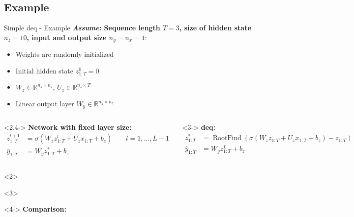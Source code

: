 \documentclass[8pt, t,
aspectratio=169,%
]{beamer}
\begin{document}
\subsection{Example}
\begin{frame}{Simple \gls{deq} - Example}
    \vspace{-0.5cm}
    \textbf{\emph{Assume}: Sequence length $T=3$, size of hidden state $n_z = 10$, input and output size $n_y = n_x = 1$}:
    \begin{itemize}
        \item Weights are randomly initialized
        \item Initial hidden state $z^0_{1:T} = 0$
        \item $W_z \in \mathbb{R}^{n_z \times n_z}$, $U_z\in \mathbb{R}^{n_z \times T}$
        \item Linear output layer $W_y \in \mathbb{R}^{n_y \times n_z}$
    \end{itemize}
    \vspace{0.2cm}
    \begin{columns}
        \begin{onlyenv}<2,4->
            \textbf{Network with fixed layer size:}
            $$
                \begin{aligned}
                    z_{1:T}^{l+1} & = \sigma\left(W_z z_{1:T}^{l} + U_z x_{1:T} + b_z\right) \qquad l=1, \ldots, L-1\\
                    \hat{y}_{1:T} & = W_y z^*_{1:T} + b_z
                \end{aligned}
            $$
        \end{onlyenv}

        \begin{onlyenv}<3->
            \textbf{\Gls{deq}:}
            $$
                \begin{aligned}
                    z_{1:T}^{*} & = \operatorname{RootFind}\left(\sigma\left(W_z z_{1:T} + U_z x_{1:T} + b_z\right)- z_{1:T}\right)\\
                    \hat{y}_{1:T} & = W_y z^L_{1:T} + b_z
                \end{aligned}
            $$
        \end{onlyenv}

    \end{columns}
    \begin{onlyenv}<2>

        \makeFwd
    \end{onlyenv}
    \begin{onlyenv}<3>
        \makeDeq
    \end{onlyenv}
    \begin{onlyenv}<4->
        \vspace{0.2cm}
        \textbf{Comparison:}
            \makeCmp
    \end{onlyenv}
\end{frame}
\end{document}
